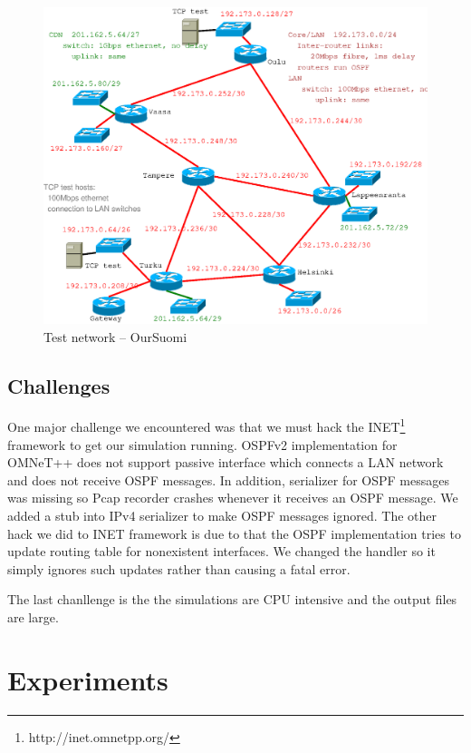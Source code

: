 \documentclass[conference,a4paper]{IEEEtran}
\begin{document}
\begin{figure}[h]
\begin{center}
\includegraphics[scale=0.5]{plan.eps}
\caption{Test network -- OurSuomi}
\label{fig1}
\end{center}
\end{figure}


\subsection{Challenges}
One major challenge we encountered was that we must hack the INET\footnote{http://inet.omnetpp.org/} framework to get our simulation running.
OSPFv2 implementation for OMNeT++ does not support passive interface which connects a LAN network and does not receive OSPF messages.
In addition, serializer for OSPF messages was missing so Pcap recorder crashes whenever it receives an OSPF message.
We added a stub into IPv4 serializer to make OSPF messages ignored.
The other hack we did to INET framework is due to that the OSPF implementation tries to update routing table for nonexistent interfaces.
We changed the handler so it simply ignores such updates rather than causing a fatal error.

The last chanllenge is the the simulations are CPU intensive and the output files are large.


\section{Experiments}
\end{document}
